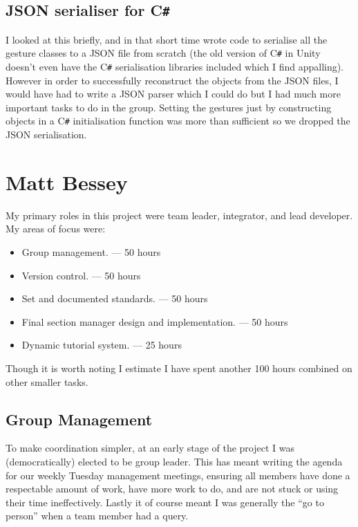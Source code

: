 \documentclass[a4paper,oneside]{memoir}
\begin{document}
			\subsection{JSON serialiser for C\texttt{\#}}

				I looked at this briefly, and in that short time wrote code to serialise all the gesture classes to a JSON file from scratch (the old version of C\texttt{\#} in Unity doesn't even have the C\texttt{\#} serialisation libraries included which I find appalling).
				However in order to successfully reconstruct the objects from the JSON files, I would have had to write a JSON parser which I could do but I had much more important tasks to do in the group.
				Setting the gestures just by constructing objects in a C\texttt{\#} initialisation function was more than sufficient so we dropped the JSON serialisation.

		\section{Matt Bessey}

			My primary roles in this project were team leader, integrator, and lead developer. My areas of focus were:

			\begin{itemize}
				\item Group management. --- 50 hours
				\item Version control. --- 50 hours
				\item Set and documented standards. --- 50 hours
				\item Final section manager design and implementation. --- 50 hours
				\item Dynamic tutorial system. --- 25 hours
			\end{itemize}

			Though it is worth noting I estimate I have spent another 100 hours combined on other smaller tasks.

			\subsection{Group Management}

				To make coordination simpler, at an early stage of the project I was (democratically) elected to be group leader. This has meant writing the agenda for our weekly Tuesday management meetings, ensuring all members have done a respectable amount of work, have more work to do, and are not stuck or using their time ineffectively. Lastly it of course meant I was generally the ``go to person'' when a team member had a query. 
\end{document}
